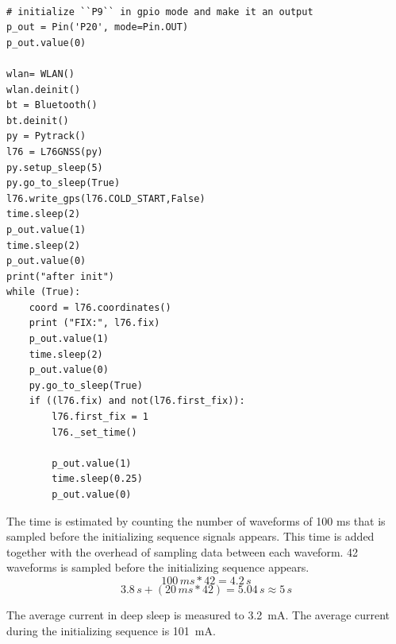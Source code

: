 \lstset{language=Python}          %
\begin{lstlisting}[frame=single,caption = main.py for deepsleep measurement]  % Start your code-block

# initialize ``P9`` in gpio mode and make it an output
p_out = Pin('P20', mode=Pin.OUT)
p_out.value(0)

wlan= WLAN()
wlan.deinit()
bt = Bluetooth()
bt.deinit()
py = Pytrack()
l76 = L76GNSS(py)
py.setup_sleep(5)
py.go_to_sleep(True)
l76.write_gps(l76.COLD_START,False)
time.sleep(2)
p_out.value(1)
time.sleep(2)
p_out.value(0)
print("after init")
while (True):
    coord = l76.coordinates()
    print ("FIX:", l76.fix)
    p_out.value(1)
    time.sleep(2)
    p_out.value(0)
    py.go_to_sleep(True)
    if ((l76.fix) and not(l76.first_fix)):
        l76.first_fix = 1
        l76._set_time()

        p_out.value(1)
        time.sleep(0.25)
        p_out.value(0)
\end{lstlisting}
\label{code:deepsleep}


The time is estimated by counting the number of waveforms of 100 ms that is sampled before the initializing sequence signals appears. This time is added together with the overhead of sampling data between each waveform. 42 waveforms is sampled before the initializing sequence appears. 
\begin{equation}
100 \,ms * 42 = 4.2 \,s
\end{equation}
\begin{equation}
3.8 \,s + (20 \,ms*42) = 5.04 \,s \approx  5 \,s
\end{equation}

The average current in deep sleep is measured to 3.2 \,mA. The average current during the initializing sequence is 101 \,mA. 







\newpage